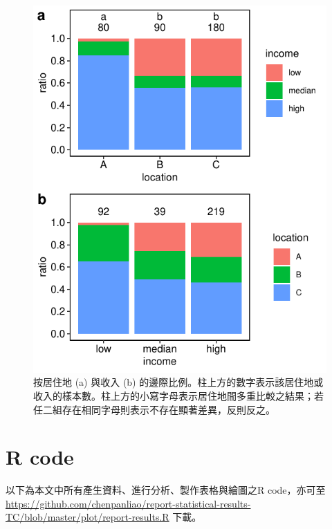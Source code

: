 \documentclass[12pt]{article}
\begin{document}
\begin{figure}[htb!]
	\centering
	\includegraphics[]{chisq_independent.pdf}
	\caption{按居住地 (a) 與收入 (b) 的邊際比例。柱上方的數字表示該居住地或收入的樣本數。柱上方的小寫字母表示居住地間多重比較之結果；若任二組存在相同字母則表示不存在顯著差異，反則反之。}
	\label{fig:chisq_independent}
\end{figure}


\clearpage
\appendix
\section{R code}
以下為本文中所有產生資料、進行分析、製作表格與繪圖之R code，亦可至 \url{https://github.com/chenpanliao/report-statistical-results-TC/blob/master/plot/report-results.R} 下載。
\end{document}
